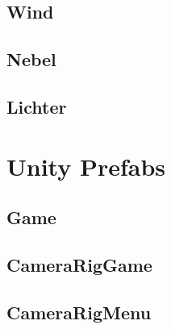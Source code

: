 \subsection{Wind}\label{subsec:wind-effect}
\subsection{Nebel}\label{subsec:fog-effect}
\subsection{Lichter}\label{subsec:light-effect}
\section{Unity Prefabs}\label{sec:prefabs}
\subsection{Game}\label{subsec:game-prefab}
\subsection{CameraRigGame}\label{subsec:camera-rig-game-prefab}
\subsection{CameraRigMenu}\label{subsec:camera-rig-menu-prefab}

